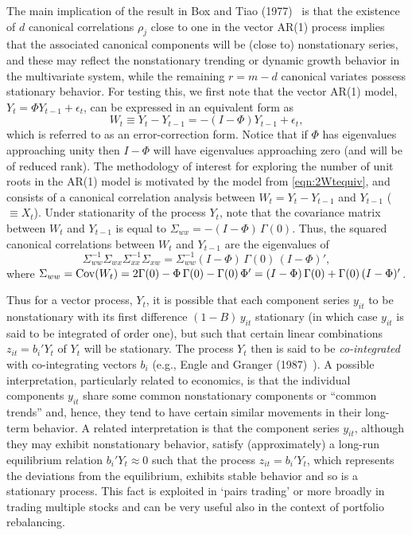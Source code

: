 The main implication of the result in Box and Tiao (1977)~\cite{box77} is that the existence of $d$ canonical correlations $\rho_j$ close to one in the vector AR(1) process implies that the associated canonical components will be (close to) nonstationary series, and these may reflect the nonstationary trending or dynamic growth behavior in the multivariate system, while the remaining $r= m - d$ canonical variates possess stationary behavior. For testing this, we first note that the vector AR(1) model, $Y_t = \Phi Y_{t-1} + \epsilon_t$, can be expressed in an equivalent form as
	\begin{equation} \label{eqn:2Wtequiv}
	W_t \equiv Y_t - Y_{t-1} = - (I - \Phi ) Y_{t-1} + \epsilon_t, 
	\end{equation}
which is referred to as an error-correction form.  Notice that if $\Phi$ has eigenvalues approaching unity then $I - \Phi$ will have eigenvalues approaching zero (and will be of reduced rank).  The methodology of interest for exploring the number of unit roots in the AR(1) model is motivated by the model from \eqref{eqn:2Wtequiv}, and consists of a canonical correlation analysis between $W_t = Y_t - Y_{t-1}$ and $Y_{t-1}$ ($\equiv X_t$).  Under stationarity of the process $Y_t$, note that the covariance matrix between $W_t$ and $Y_{t-1}$ is equal to $\Sigma_{wx} = - (I - \Phi )\, \Gamma(0)$.  Thus, the squared canonical correlations between $W_t$ and $Y_{t-1}$ are the eigenvalues of
	\begin{equation} \label{eqn:2doublesigma}
	\Sigma_{ww}^{-1} \Sigma_{wx} \Sigma_{xx}^{-1} \Sigma_{xw}= \Sigma_{ww}^{-1} ( I - \Phi )\, \Gamma(0) \,(I  - \Phi )', 
	\end{equation}
where $\Sigma_{ww} = \operatorname{Cov}(W_t) = 2 \Gamma(0) - \Phi\, \Gamma (0) - \Gamma(0)\, \Phi' = (I - \Phi )\, \Gamma (0) + \Gamma(0) \,( I - \Phi)'$. 


Thus for a vector process, $Y_t$, it is possible that each component series $y_{it}$ to be nonstationary with its first difference $(1 - B)\, y_{it}$ stationary (in which case $y_{it}$ is said to be integrated of order one), but such that certain linear combinations $z_{it} = b_i' Y_t $ of $Y_t$ will be stationary. The process $Y_t$ then is said to be \emph{co-integrated} with co-integrating vectors $b_i$ (e.g., Engle and Granger (1987)~\cite{engle1987co}).  A possible interpretation, particularly related to economics, is that the individual components $y_{it}$ share some common nonstationary components or ``common trends'' and, hence, they tend to have certain similar movements in their long-term behavior.  A related interpretation is that the component series $y_{it}$, although they may exhibit nonstationary behavior, satisfy (approximately) a long-run equilibrium relation $b_i' Y_t \approx 0$ such that the process $z_{it} = b_i' Y_t$, which represents the deviations from the equilibrium, exhibits stable behavior and so is a stationary process. This fact is exploited in `pairs trading' or more broadly in trading multiple stocks and can be very useful also in the context of portfolio rebalancing. 


